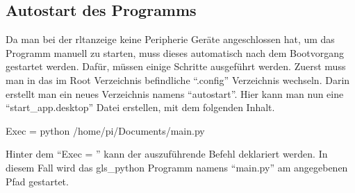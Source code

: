 \subsection{Autostart des Programms} \label{autostart}
Da man bei der \acs{rltanzeige} keine Peripherie Geräte angeschlossen hat, um das Programm manuell zu starten, muss dieses automatisch nach dem Bootvorgang gestartet werden. Dafür, müssen einige Schritte ausgeführt werden. \newline Zuerst muss man in das im Root Verzeichnis befindliche \enquote{.config} Verzeichnis wechseln. Darin erstellt man ein neues Verzeichnis namens \enquote{autostart}. Hier kann man nun eine \enquote{start\_app.desktop} Datei erstellen, mit dem folgenden Inhalt.
\begin{textcode}
Exec = python /home/pi/Documents/main.py
\end{textcode}
Hinter dem \enquote{Exec = } kann der auszuführende Befehl deklariert werden. In diesem Fall wird das \gls{gls_python} Programm namens \enquote{main.py} am angegebenen Pfad gestartet. \cite{Grace_Xing:2021}